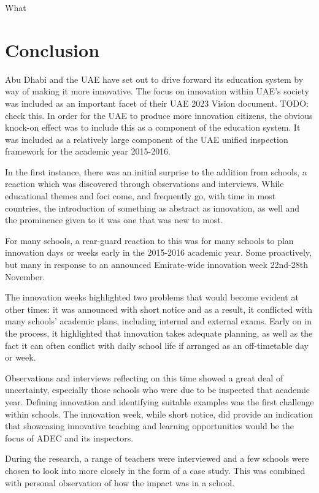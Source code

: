 What \section{Conclusion}
Abu Dhabi and the UAE have set out to drive forward its education system by way of making it more innovative. The focus on innovation within UAE’s society was included as an important facet of their UAE 2023 Vision document. TODO: check this. In order for the UAE to produce more innovation citizens, the obvious knock-on effect was to include this as a component of the education system. It was included as a relatively large component of the UAE unified inspection framework for the academic year 2015-2016.

In the first instance, there was an initial surprise to the addition from schools, a reaction which was discovered through observations and interviews. While educational themes and foci come, and frequently go, with time in most countries, the introduction of something as abstract as innovation, as well and the prominence given to it was one that was new to most.

For many schools, a rear-guard reaction to this was for many schools to plan innovation days or weeks early in the 2015-2016 academic year. Some proactively, but many in response to an announced Emirate-wide innovation week 22nd-28th November. 

The innovation weeks highlighted two problems that would become evident at other times: it was announced with short notice and as a result, it conflicted with many schools’ academic plans, including internal and external exams.
Early on in the process, it highlighted that innovation takes adequate planning, as well as the fact it can often conflict with daily school life if arranged as an off-timetable day or week.

Observations and interviews reflecting on this time showed a great deal of uncertainty, especially those schools who were due to be inspected that academic year. Defining innovation and identifying suitable examples was the first challenge within schools. The innovation week, while short notice, did provide an indication that showcasing innovative teaching and learning opportunities would be the focus of ADEC and its inspectors.

During the research, a range of teachers were interviewed and a few schools were chosen to look into more closely in the form of a case study. This was combined with personal observation of how the impact was in a school.

